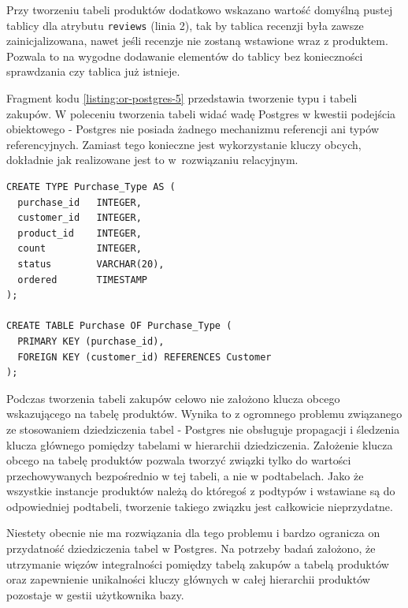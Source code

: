 \documentclass[a4paper,twoside,12pt]{book}
\begin{document}
Przy tworzeniu tabeli produktów dodatkowo wskazano wartość domyślną pustej tablicy dla atrybutu \lstinline{reviews} (linia 2), tak by tablica recenzji była zawsze zainicjalizowana, nawet jeśli recenzje nie zostaną wstawione wraz z produktem. Pozwala to na wygodne dodawanie elementów do tablicy bez konieczności sprawdzania czy tablica już istnieje.

Fragment kodu \ref{listing:or-postgres-5} przedstawia tworzenie typu i tabeli zakupów. W poleceniu tworzenia tabeli widać wadę Postgres w kwestii podejścia obiektowego - Postgres nie posiada żadnego mechanizmu referencji ani typów referencyjnych. Zamiast tego konieczne jest wykorzystanie kluczy obcych, dokładnie jak realizowane jest to w~rozwiązaniu relacyjnym.

\begin{lstlisting}[style=SQL, caption={Tworzenie typu i tabeli zakupów w Postgres.}, label={listing:or-postgres-5}, captionpos=b]
CREATE TYPE Purchase_Type AS (
  purchase_id   INTEGER,
  customer_id   INTEGER,
  product_id    INTEGER,
  count         INTEGER,
  status        VARCHAR(20),
  ordered       TIMESTAMP
);

CREATE TABLE Purchase OF Purchase_Type (
  PRIMARY KEY (purchase_id),
  FOREIGN KEY (customer_id) REFERENCES Customer
);
\end{lstlisting}

Podczas tworzenia tabeli zakupów celowo nie założono klucza obcego wskazującego na tabelę produktów. Wynika to z ogromnego problemu związanego ze stosowaniem dziedziczenia tabel - Postgres nie obsługuje propagacji i śledzenia klucza głównego pomiędzy tabelami w hierarchii dziedziczenia. Założenie klucza obcego na tabelę produktów pozwala tworzyć związki tylko do wartości przechowywanych bezpośrednio w tej tabeli, a nie w podtabelach. Jako że wszystkie instancje produktów należą do któregoś z podtypów i wstawiane są do odpowiedniej podtabeli, tworzenie takiego związku jest całkowicie nieprzydatne. 

\vspace{0.1cm}

Niestety obecnie nie ma rozwiązania dla tego problemu i bardzo ogranicza on przydatność dziedziczenia tabel w Postgres. Na potrzeby badań założono, że utrzymanie więzów integralności pomiędzy tabelą zakupów a tabelą produktów oraz zapewnienie unikalności kluczy głównych w całej hierarchii produktów pozostaje w gestii użytkownika bazy.

\vspace{0.1cm}
\end{document}
